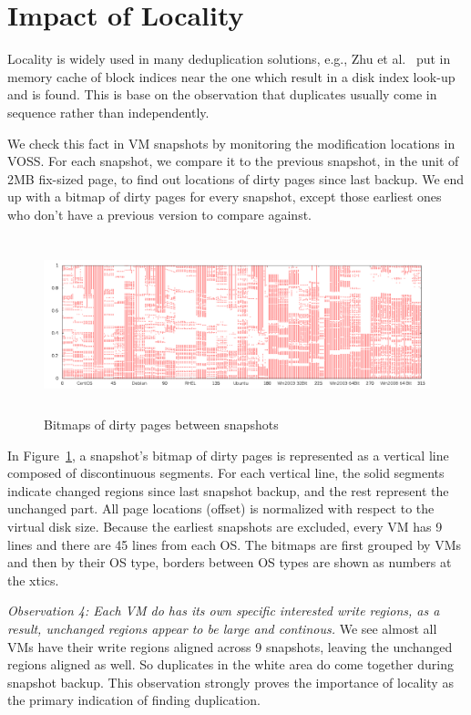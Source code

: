 \section{Impact of Locality}
Locality is widely used in many deduplication solutions, e.g., Zhu et al.~\cite{bottleneck08}
put in memory cache of block indices near the one which result in a disk index look-up and is found.
This is base on the observation that duplicates usually come in sequence rather than independently.

We check this fact in VM snapshots by monitoring the modification locations in VOSS. 
For each snapshot, we compare it to the previous snapshot, in the unit of 2MB fix-sized page,
to find out locations of dirty pages since last backup. We end up with a bitmap of
dirty pages for every snapshot, except those earliest ones who don't have a previous version
to compare against.

\begin{figure}[htb]
  \centering
  \includegraphics[width=6.5in,height=2in]{countmodify.png}
\caption{Bitmaps of dirty pages between snapshots}
\label{fig:dirty}
\end{figure}

In Figure~\ref{fig:dirty}, a snapshot's bitmap of dirty pages is represented as a vertical line 
composed of discontinuous segments. 
For each vertical line, the solid segments indicate changed regions since last snapshot backup,
and the rest represent the unchanged part.
All page locations (offset) is normalized with respect to the virtual disk size.
Because the earliest snapshots are excluded, 
every VM has 9 lines and there are 45 lines from each OS.
The bitmaps are first grouped by VMs and then by their OS type,
borders between OS types are shown as numbers at the xtics.

\emph{Observation 4: Each VM do has its own specific interested write regions, as a result, 
unchanged regions appear to be large and continous.} We see almost all VMs have
their write regions aligned across 9 snapshots, leaving the unchanged regions aligned as well.
So duplicates in the white area do come together during snapshot backup.
This observation strongly proves the importance of locality as the primary indication of
finding duplication.

